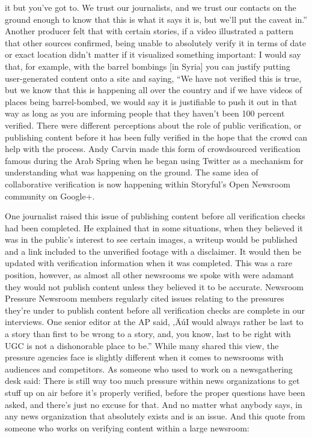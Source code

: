 \documentclass[symmetric, notoc, nobib]{towcenter-book}
\begin{document}
it but you've got to. We trust our journalists, and we trust our contacts on
the ground enough to know that this is what it says it is, but we'll put the
caveat in.''
Another producer felt that with certain stories, if a video illustrated a pattern
that other sources confirmed, being unable to absolutely verify it in terms
of date or exact location didn't matter if it visualized something important:
I would say that, for example, with the barrel bombings [in Syria]
you can justify putting user-generated content onto a site and saying,
``We have not verified this is true, but we know that this is happening
all over the country and if we have videos of places being
barrel-bombed, we would say it is justifiable to push it out in that
way as long as you are informing people that they haven't been
100 percent verified.
There were different perceptions about the role of public verification, or
publishing content before it has been fully verified in the hope that the
crowd can help with the process. Andy Carvin made this form of crowdsourced
verification famous during the Arab Spring when he began using
Twitter as a mechanism for understanding what was happening on the
ground. The same idea of collaborative verification is now happening within
Storyful's Open Newsroom community on Google+.

One journalist raised this issue of publishing content before all verification
checks had been completed. He explained that in some situations, when
they believed it was in the public's interest to see certain images, a writeup
would be published and a link included to the unverified footage with a
disclaimer. It would then be updated with verification information when it
was completed. This was a rare position, however, as almost all other newsrooms
we spoke with were adamant they would not publish content unless
they believed it to be accurate.
Newsroom Pressure
Newsroom members regularly cited issues relating to the pressures they're
under to publish content before all verification checks are complete in our
interviews. One senior editor at the AP said, ‚ÄúI would always rather be last
to a story than first to be wrong to a story, and, you know, last to be right
with UGC is not a dishonorable place to be.''
While many shared this view, the pressure agencies face is slightly different
when it comes to newsrooms with audiences and competitors. As someone
who used to work on a newsgathering desk said:
There is still way too much pressure within news organizations to get
stuff up on air before it's properly verified, before the proper questions
have been asked, and there's just no excuse for that. And no
matter what anybody says, in any news organization that absolutely
exists and is an issue.
And this quote from someone who works on verifying content within a
large newsroom:
\end{document}
